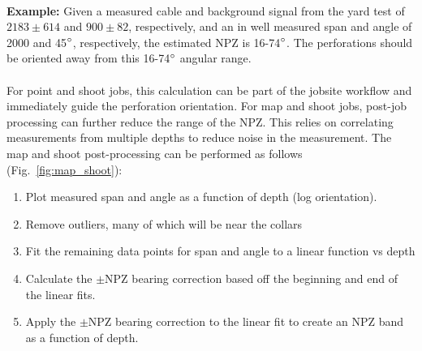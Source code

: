 \documentclass[paper=a4, fontsize=11pt]{scrartcl}
\numberwithin{equation}{section}		%
\numberwithin{figure}{section}			%
\numberwithin{table}{section}				%
\begin{document}
\paragraph{}
\textbf{Example:} Given a measured cable and background signal from the yard test of ${2183\pm614}$ and ${900\pm82}$, respectively, and an in well measured span and angle of 2000 and 45$\degree$, respectively, the estimated NPZ is 16-74$\degree$.  The perforations should be oriented away from this 16-74$\degree$ angular range.

\paragraph{}
For point and shoot jobs, this calculation can be part of the jobsite workflow and immediately guide the perforation orientation.  For map and shoot jobs, post-job processing can further reduce the range of the NPZ.  This relies on correlating measurements from multiple depths to reduce noise in the measurement.  The map and shoot post-processing can be performed as follows (Fig.~\ref{fig:map_shoot}):
\begin{enumerate}
    \item Plot measured span and angle as a function of depth (log orientation).
    \item Remove outliers, many of which will be near the collars
    \item Fit the remaining data points for span and angle to a linear function vs depth
    \item Calculate the $\pm$NPZ bearing correction based off the beginning and end of the linear fits.
    \item Apply the $\pm$NPZ bearing correction to the linear fit to create an NPZ band as a function of depth.
\end{enumerate}
\end{document}

